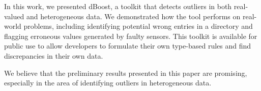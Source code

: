 
In this work, we presented dBoost, a toolkit that detects outliers in both real-valued and heterogeneous data.
We demonstrated how the tool performs on real-world problems, including identifying potential wrong entries in a directory and flagging erroneous values generated by faulty sensors.
This toolkit is available for public use to allow developers to formulate their own type-based rules and find discrepancies in their own data.

We believe that the preliminary results presented in this paper are promising, especially in the area of identifying outliers in heterogeneous data.

